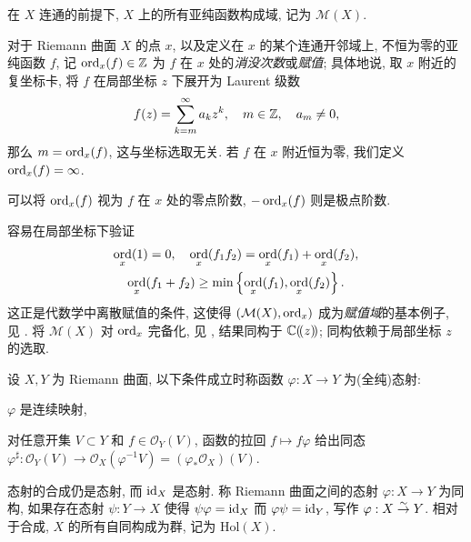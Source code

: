 \begin{definition}\label{def:meromorphic-function-field}
	在 $X$ 连通的前提下, $X$ 上的所有亚纯函数构成域, 记为 $\mathcal{M}(X)$.
\end{definition}

\begin{definition}\label{def:vanishing-order}  
	对于 Riemann 曲面 $X$ 的点 $x$, 以及定义在 $x$ 的某个连通开邻域上, 不恒为零的亚纯函数 $f$, 记 $\operatorname*{ord}_x(f) \in \mathbb{Z}$ 为 $f$ 在 $x$ 处的\emph{消没次数}或\emph{赋值}; 具体地说, 取 $x$ 附近的复坐标卡, 将 $f$ 在局部坐标 $z$ 下展开为 Laurent 级数
	\[ f(z) = \sum_{k=m}^\infty a_k z^k, \quad m \in \mathbb{Z}, \quad a_m \neq 0, \]
	那么 $m = \operatorname*{ord}_x(f)$, 这与坐标选取无关. 若 $f$ 在 $x$ 附近恒为零, 我们定义 $\operatorname*{ord}_x(f) = \infty$.
\end{definition}

可以将 $\operatorname*{ord}_x(f)$ 视为 $f$ 在 $x$ 处的零点阶数, $-\operatorname*{ord}_x(f)$ 则是极点阶数.

\begin{remark}
	容易在局部坐标下验证
	\begin{equation*}\begin{gathered}
		\operatorname*{ord}_x(1) = 0, \quad \operatorname*{ord}_x(f_1 f_2) = \operatorname*{ord}_x(f_1) + \operatorname*{ord}_x(f_2), \\
		\operatorname*{ord}_x(f_1 + f_2) \geq \min\left\{ \operatorname*{ord}_x(f_1), \operatorname*{ord}_x(f_2) \right\}.
	\end{gathered}\end{equation*}
	这正是代数学中离散赋值的条件, 这使得 $\left(\mathcal{M}(X), \operatorname*{ord}_x\right)$ 成为\emph{赋值域}的基本例子, 见 \cite[\S 10.3]{Li1}. 将 $\mathcal{M}(X)$ 对 $\operatorname*{ord}_x$ 完备化, 见 \cite[\S 10.2]{Li1}, 结果同构于 $\mathbb{C}(\!(z)\!)$; 同构依赖于局部坐标 $z$ 的选取.
\end{remark}

\begin{definition}
	设 $X, Y$ 为 Riemann 曲面, 以下条件成立时称函数 $\varphi: X \to Y$ 为(全纯)态射:
	\begin{compactitem}
		\item $\varphi$ 是连续映射,
		\item 对任意开集 $V \subset Y$ 和 $f \in \mathscr{O}_Y(V)$, 函数的拉回 $f \mapsto f \varphi$ 给出同态 $\varphi^\sharp: \mathscr{O}_Y(V) \to \mathscr{O}_X(\varphi^{-1}V) = (\varphi_* \mathcal{O}_X)(V)$.
	\end{compactitem}
\end{definition}

态射的合成仍是态射, 而 $\mathrm{id}_X$ 是态射. 称 Riemann 曲面之间的态射 $\varphi: X \to Y$ 为同构, 如果存在态射 $\psi: Y \to X$ 使得 $\psi \varphi = \mathrm{id}_X$ 而 $\varphi \psi = \mathrm{id}_Y$, 写作 $\varphi: X \stackrel{\sim}{\rightarrow} Y$. 相对于合成, $X$ 的所有自同构成为群, 记为 $\mathrm{Hol}(X)$. 


